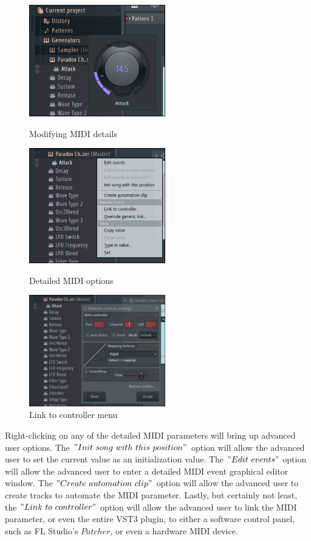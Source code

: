 \documentclass[a4paper,12pt]{report}
\begin{document}
\begin{figure} \centering
\includegraphics[width=16em]{ModifyingDetailedMIDI.png}
    \caption{Modifying MIDI details}     \label{fig:ModifyingDetailedMIDI}
    \includegraphics[width=16em]{ExtraOptions01.png}
    \caption{Detailed MIDI options}     \label{fig:ExtraOptions01}
    \includegraphics[width=16em]{ExtraOptions02.png}
    \caption{Link to controller menu}     \label{fig:ExtraOptions02}
    \end{figure}

Right-clicking on any of the detailed MIDI parameters will bring up advanced user options. The $"Init\ song\ with\ this\ position"$ option will allow the advanced user to set the current value as an initialization value. The $"Edit\ events"$ option will allow the advanced user to enter a detailed MIDI event graphical editor window. The $"Create\ automation\ clip"$ option will allow the advanced user to create tracks to automate the MIDI parameter. Lastly, but certainly not least, the $"Link\ to\ controller"$ option will allow the advanced user to link the MIDI parameter, or even the entire VST3 plugin, to either a software control panel, such as FL Studio's $Patcher$, or even a hardware MIDI device.
\end{document}
